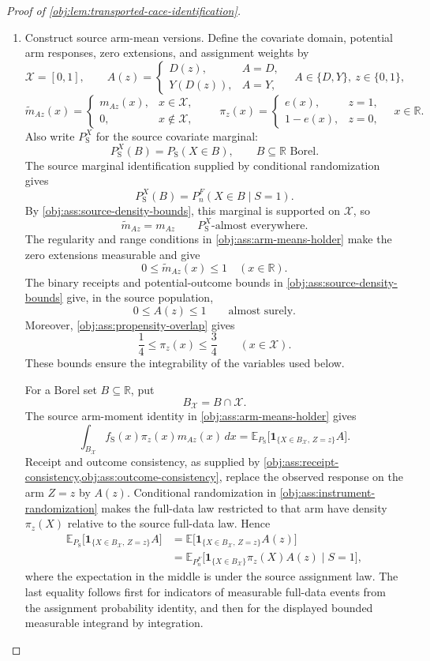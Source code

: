 \begin{proof}[Proof of \cref{obj:lem:transported-cace-identification}]
\begin{enumerate}
\item Construct source arm-mean versions. Define the covariate domain, potential arm responses, zero extensions, and assignment weights by
\[
\mathcal X=[0,1],\qquad
A(z)=
\begin{cases}
D(z),&A=D,\\
Y(D(z)),&A=Y,
\end{cases}
\quad A\in\{D,Y\},\ z\in\{0,1\},
\]
\[
\widetilde m_{Az}(x)=
\begin{cases}
m_{Az}(x),&x\in\mathcal X,\\
0,&x\notin\mathcal X,
\end{cases}
\qquad
\pi_z(x)=
\begin{cases}
e(x),&z=1,\\
1-e(x),&z=0,
\end{cases}
\quad x\in\mathbb R.
\]
Also write \(P_{\mathrm S}^{X}\) for the source covariate marginal:
\[
P_{\mathrm S}^{X}(B)=P_{\mathrm S}(X\in B),
\qquad B\subseteq\mathbb R\text{ Borel}.
\]
The source marginal identification supplied by conditional randomization gives
\[
P_{\mathrm S}^{X}(B)=P_n^F(X\in B\mid S=1).
\]
By \cref{obj:ass:source-density-bounds}, this marginal is supported on \(\mathcal X\), so
\[
\widetilde m_{Az}=m_{Az}
\qquad P_{\mathrm S}^{X}\text{-almost everywhere}.
\]
The regularity and range conditions in \cref{obj:ass:arm-means-holder} make the zero extensions measurable and give
\[
0\le \widetilde m_{Az}(x)\le1
\quad(x\in\mathbb R).
\]
The binary receipts and potential-outcome bounds in
\cref{obj:ass:source-density-bounds} give, in the source population,
\[
0\le A(z)\le1
\qquad\text{almost surely}.
\]
Moreover, \cref{obj:ass:propensity-overlap} gives
\[
\frac14\le\pi_z(x)\le\frac34
\qquad(x\in\mathcal X).
\]
These bounds ensure the integrability of the variables used below.

For a Borel set \(B\subseteq\mathbb R\), put
\[
B_{\mathcal X}=B\cap\mathcal X.
\]
The source arm-moment identity in \cref{obj:ass:arm-means-holder} gives
\[
\int_{B_{\mathcal X}}
 f_{\mathrm S}(x)\pi_z(x)m_{Az}(x)\,dx
=
\mathbb E_{P_{\mathrm S}}
 \bigl[\mathbf1_{\{X\in B_{\mathcal X},\,Z=z\}}A\bigr].
\]
Receipt and outcome consistency, as supplied by
\cref{obj:ass:receipt-consistency,obj:ass:outcome-consistency},
replace the observed response on the arm \(Z=z\) by \(A(z)\).
Conditional randomization in \cref{obj:ass:instrument-randomization}
makes the full-data law restricted to that arm have density
\(\pi_z(X)\) relative to the source full-data law. Hence
\[
\begin{aligned}
\mathbb E_{P_{\mathrm S}}
 \bigl[\mathbf1_{\{X\in B_{\mathcal X},\,Z=z\}}A\bigr]
&=\mathbb E
 \bigl[\mathbf1_{\{X\in B_{\mathcal X},\,Z=z\}}A(z)\bigr]\\
&=\mathbb E_{P_n^F}
 \bigl[\mathbf1_{\{X\in B_{\mathcal X}\}}\pi_z(X)A(z)
       \mid S=1\bigr],
\end{aligned}
\]
where the expectation in the middle is under the source assignment law. The last equality follows first for indicators of measurable full-data events from the assignment probability identity, and then for the displayed bounded measurable integrand by integration.


\end{enumerate}
\end{proof}

